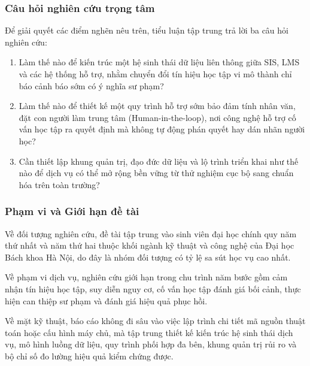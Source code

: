 \subsubsection{Câu hỏi nghiên cứu trọng tâm}
Để giải quyết các điểm nghẽn nêu trên, tiểu luận tập trung trả lời ba câu hỏi nghiên cứu:
\begin{enumerate}
    \item Làm thế nào để kiến trúc một hệ sinh thái dữ liệu liên thông giữa SIS, LMS và các hệ thống hỗ trợ, nhằm chuyển đổi tín hiệu học tập vi mô thành chỉ báo cảnh báo sớm có ý nghĩa sư phạm?
    \item Làm thế nào để thiết kế một quy trình hỗ trợ sớm bảo đảm tính nhân văn, đặt con người làm trung tâm (Human-in-the-loop), nơi công nghệ hỗ trợ cố vấn học tập ra quyết định mà không tự động phán quyết hay dán nhãn người học?
    \item Cần thiết lập khung quản trị, đạo đức dữ liệu và lộ trình triển khai như thế nào để dịch vụ có thể mở rộng bền vững từ thử nghiệm cục bộ sang chuẩn hóa trên toàn trường?
\end{enumerate}

\subsubsection{Phạm vi và Giới hạn đề tài}
Về đối tượng nghiên cứu, đề tài tập trung vào sinh viên đại học chính quy năm thứ nhất và năm thứ hai thuộc khối ngành kỹ thuật và công nghệ của Đại học Bách khoa Hà Nội, do đây là nhóm đối tượng có tỷ lệ sa sút học vụ cao nhất. 

Về phạm vi dịch vụ, nghiên cứu giới hạn trong chu trình năm bước gồm cảm nhận tín hiệu học tập, suy diễn nguy cơ, cố vấn học tập đánh giá bối cảnh, thực hiện can thiệp sư phạm và đánh giá hiệu quả phục hồi. 

Về mặt kỹ thuật, báo cáo không đi sâu vào việc lập trình chi tiết mã nguồn thuật toán hoặc cấu hình máy chủ, mà tập trung thiết kế kiến trúc hệ sinh thái dịch vụ, mô hình luồng dữ liệu, quy trình phối hợp đa bên, khung quản trị rủi ro và bộ chỉ số đo lường hiệu quả kiểm chứng được.

